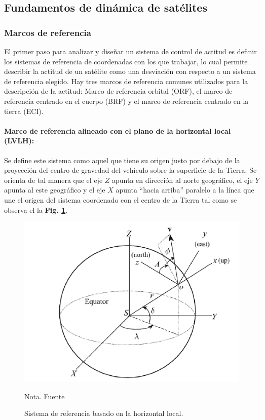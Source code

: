 \subsection{Fundamentos de dinámica de satélites}

\subsubsection{Marcos de referencia}
\hfill \break
El primer paso para analizar y diseñar un sistema de control de actitud es definir los sistemas de referencia de coordenadas con los que trabajar, lo cual permite describir la actitud de un satélite como una desviación con respecto a un sistema de referencia elegido. Hay tres marcos de referencia comunes utilizados para la descripción de la actitud: Marco de referencia orbital (ORF), el marco de referencia centrado en el cuerpo (BRF) y el marco de referencia centrado en la tierra (ECI). 

\paragraph{Marco de referencia alineado con el plano de la horizontal local (LVLH):} Se define este sistema como aquel que tiene su origen justo por debajo de la proyección del centro de gravedad del vehículo sobre la superficie de la Tierra. Se orienta de tal manera que el eje $Z$ apunta en dirección al norte
geográfico, el eje $Y$ apunta al este geográfico y el eje $X$ apunta “hacia arriba”
paralelo a la línea que une el origen del sistema coordenado con el centro de la
Tierra tal como se observa el la \textbf{Fig. \ref{fig:LVLH}}.

\begin{figure}[!ht]
	\begin{center}
		\includegraphics[scale=0.7]{imagenes/marco_teorico/LVLH.PNG}\\
	\end{center}
	\caption{ Sistema de referencia basado en la horizontal local.}
	\label{fig:LVLH}
	\footnotesize{Nota. Fuente \cite{cornelisse1979rocket}}
\end{figure}

